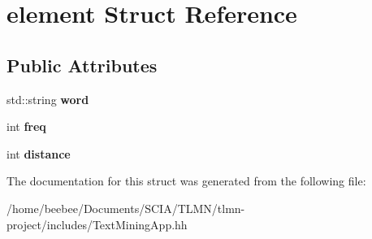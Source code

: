 \hypertarget{structelement}{}\section{element Struct Reference}
\label{structelement}
\subsection*{Public Attributes}
\begin{DoxyCompactItemize}
\item 
\mbox{\label{structelement_ad670a51bc275ae50e273463bb1a59999}} 
std\+::string {\bfseries word}
\item 
\mbox{\label{structelement_a9fe9f7453f39a3575e258e93caa1f28b}} 
int {\bfseries freq}
\item 
\mbox{\label{structelement_a09e685f1ccad0d42287543aa385b8326}} 
int {\bfseries distance}
\end{DoxyCompactItemize}


The documentation for this struct was generated from the following file\+:\begin{DoxyCompactItemize}
\item 
/home/beebee/\+Documents/\+S\+C\+I\+A/\+T\+L\+M\+N/tlmn-\/project/includes/Text\+Mining\+App.\+hh\end{DoxyCompactItemize}
